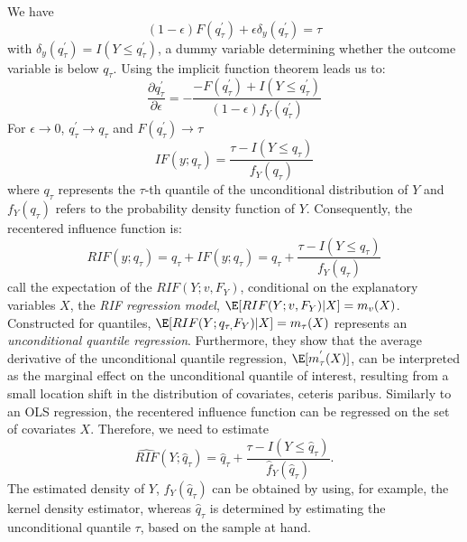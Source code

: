 We have
\begin{equation*}
  (1-\epsilon)F(q_{\tau}^{'})+\epsilon \delta_{y}(q_{\tau}^{'})=\tau
\end{equation*}
with $\delta_{y}(q_{\tau}^{'})=I(Y\leq q_{\tau}^{'})$, a dummy variable determining whether the outcome variable is below $q_{\tau}$. Using the implicit function theorem leads us to:
\begin{equation*}\label{13}
  \frac{\partial q_{\tau}^{'}}{\partial \epsilon}=-\frac{-F(q_{\tau}^{'})+I(Y \leq q_{\tau}^{'})}{(1-\epsilon)f_{Y}(q_{\tau}^{'})}
\end{equation*}
For $\epsilon \rightarrow 0$, $q_{\tau}^{'} \rightarrow q_{\tau}$ and $F(q_{\tau}^{'}) \rightarrow \tau$
\begin{equation}\label{14}
  IF(y;q_{\tau})=\frac{\tau - I(Y \leq q_{\tau})}{f_{Y}(q_{\tau})}
\end{equation}
where $q_{\tau}$ represents the $\tau$-th quantile of the unconditional distribution of $Y$ and $f_{Y}(q_{\tau})$ refers to the probability density function of $Y$. Consequently, the recentered influence function is:
\begin{equation}\label{15}
  RIF(y;q_{\tau})=q_{\tau}+IF(y;q_{\tau})=q_{\tau} + \frac{\tau - I(Y \leq q_{\tau})}{f_{Y}(q_{\tau})}
\end{equation}
\cite{Firpo&Fortin&Lemieux:09} call the expectation of the $RIF(Y; v,F_{Y})$, conditional on the explanatory variables $X$, the \emph{RIF regression model}, $\E[RIF(Y; v, F_{Y})|X]=m_{v}(X)$. Constructed for quantiles, $\E[RIF(Y; q_{\tau,} F_{Y})|X]=m_{\tau}(X)$ represents an \emph{unconditional quantile regression}. Furthermore, they show that the average derivative of the unconditional quantile regression, $\E[m_{\tau}^{'}(X)]$, can be interpreted as the marginal effect on the unconditional quantile of interest, resulting from a small location shift in the distribution of covariates, ceteris paribus. Similarly to an OLS regression, the recentered influence function can be regressed on the set of covariates $X$. Therefore, we need to estimate
\begin{equation*}
  \widehat{RIF}(Y; \hat{q}_{\tau})=\hat{q}_{\tau}+ \frac{\tau - I(Y \leq \hat{q}_{\tau})}{\hat{f}_{Y}(\hat{q}_{\tau})}.
\end{equation*}
The estimated density of $Y$, $\hat{f}_{Y}(\hat{q}_{\tau})$ can be obtained by using, for example, the kernel density estimator, whereas $\hat{q}_{\tau}$ is determined by estimating the unconditional quantile $\tau$, based on the sample at hand.

